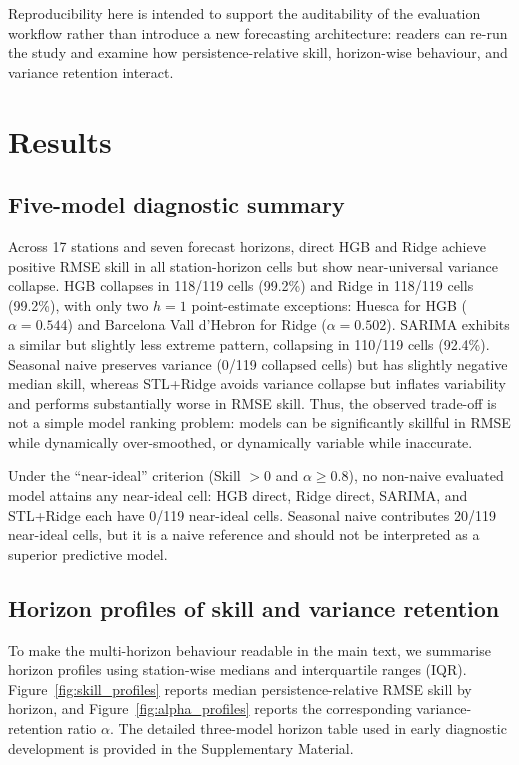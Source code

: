 \documentclass[3p,times,single-column]{elsarticle}
\begin{document}
Reproducibility here is intended to support the auditability of the evaluation workflow rather than introduce a new forecasting architecture: readers can re-run the study and examine how persistence-relative skill, horizon-wise behaviour, and variance retention interact.

\section{Results}

\subsection{Five-model diagnostic summary}
\label{sec:results_five_model_summary}

Across 17 stations and seven forecast horizons, direct HGB and Ridge achieve positive RMSE skill in all station-horizon cells but show near-universal variance collapse. HGB collapses in 118/119 cells (99.2\%) and Ridge in 118/119 cells (99.2\%), with only two $h=1$ point-estimate exceptions: Huesca for HGB ($\alpha = 0.544$) and Barcelona Vall d'Hebron for Ridge ($\alpha = 0.502$). SARIMA exhibits a similar but slightly less extreme pattern, collapsing in 110/119 cells (92.4\%). Seasonal naive preserves variance (0/119 collapsed cells) but has slightly negative median skill, whereas STL+Ridge avoids variance collapse but inflates variability and performs substantially worse in RMSE skill. Thus, the observed trade-off is not a simple model ranking problem: models can be significantly skillful in RMSE while dynamically over-smoothed, or dynamically variable while inaccurate.



Under the ``near-ideal'' criterion (Skill $>0$ and $\alpha \geq 0.8$), no non-naive evaluated model attains any near-ideal cell: HGB direct, Ridge direct, SARIMA, and STL+Ridge each have 0/119 near-ideal cells. Seasonal naive contributes 20/119 near-ideal cells, but it is a naive reference and should not be interpreted as a superior predictive model.

\subsection{Horizon profiles of skill and variance retention}

To make the multi-horizon behaviour readable in the main text, we summarise horizon profiles using station-wise medians and interquartile ranges (IQR). Figure~\ref{fig:skill_profiles} reports median persistence-relative RMSE skill by horizon, and Figure~\ref{fig:alpha_profiles} reports the corresponding variance-retention ratio $\alpha$. The detailed three-model horizon table used in early diagnostic development is provided in the Supplementary Material.
\end{document}
